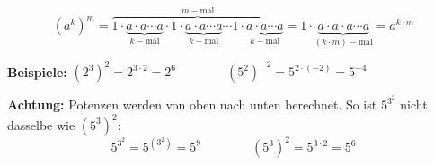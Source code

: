 \[
  (a^{k})^{m} = \overbrace{1\cdot\underbrace{a\cdot a\cdots a}_{k-\text{mal}}\cdot 1\cdot\underbrace{a\cdot a\cdots a}_{k-\text{mal}}\cdots 1\cdot\underbrace{a\cdot a\cdots a}_{k-\text{mal}}}^{m-\text{mal}} = 1\cdot\underbrace{a\cdot a\cdot a\cdots a}_{(k\cdot m)-\text{mal}} = a^{k\cdot m}
\]
\begin{example}
  \textbf{Beispiele:} $\displaystyle (2^{3})^{2} = 2^{3\cdot 2} = 2^{6} \qquad\qquad (5^{2})^{-2} = 5^{2\cdot(-2)} = 5^{-4}$
\end{example}
\begin{note}
  \textbf{Achtung:} Potenzen werden von oben nach unten berechnet. So ist $5^{3^{2}}$ nicht dasselbe wie $\left(5^{3}\right)^{2}$:
  \[
    5^{3^{2}} = 5^{\left(3^{2}\right)} = 5^{9} \qquad\qquad \left(5^{3}\right)^{2} = 5^{3\cdot 2} = 5^{6}
  \]
\end{note}
